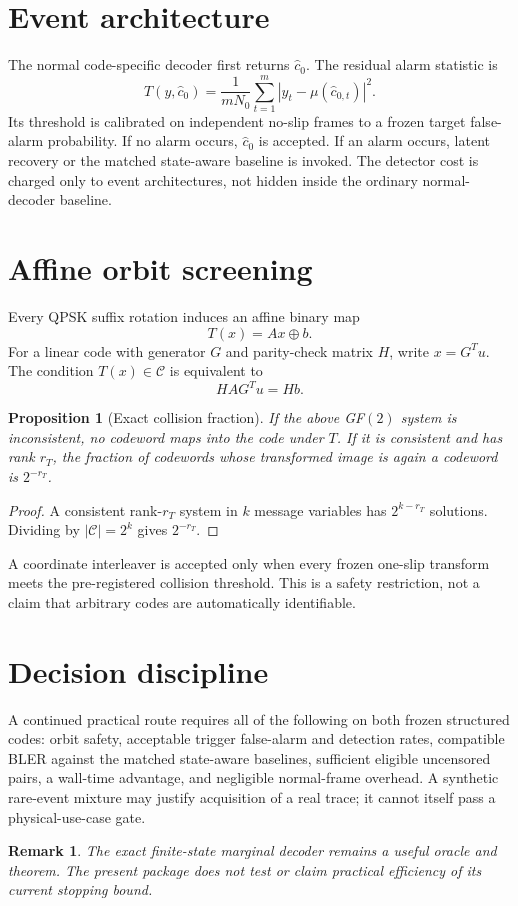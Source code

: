 \documentclass[11pt]{article}
\newtheorem{proposition}{Proposition}
\newtheorem{remark}{Remark}
\begin{document}
\section{Event architecture}
The normal code-specific decoder first returns $\widehat c_0$.  The residual
alarm statistic is
\begin{equation}
 T(y,\widehat c_0)=\frac{1}{mN_0}
 \sum_{t=1}^{m}\left|y_t-\mu(\widehat c_{0,t})\right|^2.
\end{equation}
Its threshold is calibrated on independent no-slip frames to a frozen target
false-alarm probability.  If no alarm occurs, $\widehat c_0$ is accepted.  If an
alarm occurs, latent recovery or the matched state-aware baseline is invoked.
The detector cost is charged only to event architectures, not hidden inside the
ordinary normal-decoder baseline.

\section{Affine orbit screening}
Every QPSK suffix rotation induces an affine binary map
\begin{equation}
 T(x)=Ax\oplus b.
\end{equation}
For a linear code with generator $G$ and parity-check matrix $H$, write
$x=G^Tu$.  The condition $T(x)\in\mathcal C$ is equivalent to
\begin{equation}
 HAG^Tu=Hb.
\end{equation}
\begin{proposition}[Exact collision fraction]
If the above GF$(2)$ system is inconsistent, no codeword maps into the code
under $T$.  If it is consistent and has rank $r_T$, the fraction of codewords
whose transformed image is again a codeword is $2^{-r_T}$.
\end{proposition}
\begin{proof}
A consistent rank-$r_T$ system in $k$ message variables has
$2^{k-r_T}$ solutions.  Dividing by $|\mathcal C|=2^k$ gives $2^{-r_T}$.
\end{proof}

A coordinate interleaver is accepted only when every frozen one-slip transform
meets the pre-registered collision threshold.  This is a safety restriction,
not a claim that arbitrary codes are automatically identifiable.

\section{Decision discipline}
A continued practical route requires all of the following on both frozen
structured codes: orbit safety, acceptable trigger false-alarm and detection
rates, compatible BLER against the matched state-aware baselines, sufficient
eligible uncensored pairs, a wall-time advantage, and negligible normal-frame
overhead.  A synthetic rare-event mixture may justify acquisition of a real
trace; it cannot itself pass a physical-use-case gate.

\begin{remark}
The exact finite-state marginal decoder remains a useful oracle and theorem.
The present package does not test or claim practical efficiency of its current
stopping bound.
\end{remark}
\end{document}
